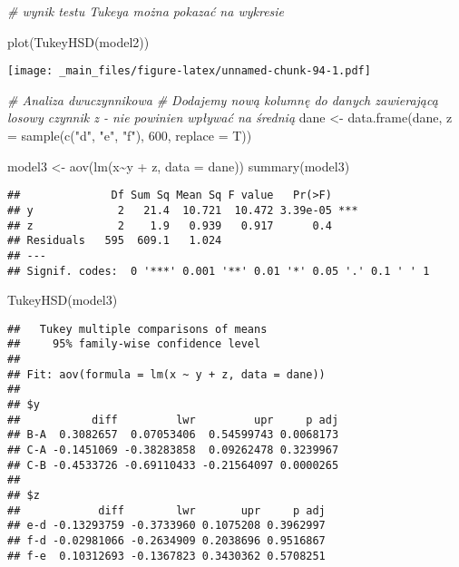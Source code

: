 \documentclass[
]{book}
\newenvironment{Shaded}{\begin{snugshade}}{\end{snugshade}}
\newcommand{\AttributeTok}[1]{\textcolor[rgb]{0.77,0.63,0.00}{#1}}
\newcommand{\CommentTok}[1]{\textcolor[rgb]{0.56,0.35,0.01}{\textit{#1}}}
\newcommand{\DecValTok}[1]{\textcolor[rgb]{0.00,0.00,0.81}{#1}}
\newcommand{\FunctionTok}[1]{\textcolor[rgb]{0.00,0.00,0.00}{#1}}
\newcommand{\NormalTok}[1]{#1}
\newcommand{\OtherTok}[1]{\textcolor[rgb]{0.56,0.35,0.01}{#1}}
\newcommand{\SpecialCharTok}[1]{\textcolor[rgb]{0.00,0.00,0.00}{#1}}
\newcommand{\StringTok}[1]{\textcolor[rgb]{0.31,0.60,0.02}{#1}}
\begin{document}
\begin{Shaded}
\begin{Highlighting}[]
\CommentTok{\# wynik testu Tukeya można pokazać na wykresie}

\FunctionTok{plot}\NormalTok{(}\FunctionTok{TukeyHSD}\NormalTok{(model2))}
\end{Highlighting}
\end{Shaded}

\texttt{[image: \_main\_files/figure-latex/unnamed-chunk-94-1.pdf]}

\begin{Shaded}
\begin{Highlighting}[]
\CommentTok{\# Analiza dwuczynnikowa}
\CommentTok{\# Dodajemy nową kolumnę do danych zawierającą losowy czynnik z {-} nie powinien wpływać na średnią}
\NormalTok{dane }\OtherTok{\textless{}{-}} \FunctionTok{data.frame}\NormalTok{(dane, }\AttributeTok{z =} \FunctionTok{sample}\NormalTok{(}\FunctionTok{c}\NormalTok{(}\StringTok{"d"}\NormalTok{, }\StringTok{"e"}\NormalTok{, }\StringTok{"f"}\NormalTok{), }\DecValTok{600}\NormalTok{, }\AttributeTok{replace =}\NormalTok{ T))}

\NormalTok{model3 }\OtherTok{\textless{}{-}} \FunctionTok{aov}\NormalTok{(}\FunctionTok{lm}\NormalTok{(x}\SpecialCharTok{\textasciitilde{}}\NormalTok{y }\SpecialCharTok{+}\NormalTok{ z, }\AttributeTok{data =}\NormalTok{ dane))}
\FunctionTok{summary}\NormalTok{(model3)}
\end{Highlighting}
\end{Shaded}

\begin{verbatim}
##              Df Sum Sq Mean Sq F value   Pr(>F)    
## y             2   21.4  10.721  10.472 3.39e-05 ***
## z             2    1.9   0.939   0.917      0.4    
## Residuals   595  609.1   1.024                     
## ---
## Signif. codes:  0 '***' 0.001 '**' 0.01 '*' 0.05 '.' 0.1 ' ' 1
\end{verbatim}

\begin{Shaded}
\begin{Highlighting}[]
\FunctionTok{TukeyHSD}\NormalTok{(model3)}
\end{Highlighting}
\end{Shaded}

\begin{verbatim}
##   Tukey multiple comparisons of means
##     95% family-wise confidence level
## 
## Fit: aov(formula = lm(x ~ y + z, data = dane))
## 
## $y
##           diff         lwr         upr     p adj
## B-A  0.3082657  0.07053406  0.54599743 0.0068173
## C-A -0.1451069 -0.38283858  0.09262478 0.3239967
## C-B -0.4533726 -0.69110433 -0.21564097 0.0000265
## 
## $z
##            diff        lwr       upr     p adj
## e-d -0.13293759 -0.3733960 0.1075208 0.3962997
## f-d -0.02981066 -0.2634909 0.2038696 0.9516867
## f-e  0.10312693 -0.1367823 0.3430362 0.5708251
\end{verbatim}
\end{document}
